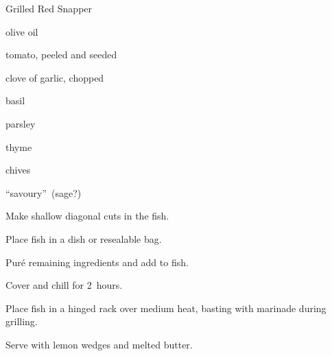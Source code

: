 \begin{recipe}{Grilled Red Snapper\FIXME}{}{}

\begin{ingredients}
\item {} 
\item \C{\half} olive oil
\item tomato, peeled and seeded
\item clove of garlic, chopped
\item {} basil
\item {} parsley
\item {} thyme
\item {} chives
\item {} ``savoury''~(sage?)
\end{ingredients}

\begin{directions}
\item Make shallow diagonal cuts in the fish.
\item Place fish in a dish or resealable bag.
\item Pur\'e remaining ingredients and add to fish.
\item Cover and chill for 2~hours.
\item Place fish in a hinged rack over medium heat, basting with marinade during grilling.
\item Serve with lemon wedges and melted butter.
\end{directions}

\end{recipe}
